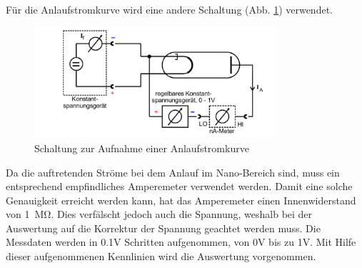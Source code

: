 Für die Anlaufstromkurve wird eine andere Schaltung (Abb. \ref{fig:8}) verwendet.
\begin{figure}[H]
  \centering
  \includegraphics[width=0.8\textwidth]{content/8.png}
  \caption{Schaltung zur Aufnahme einer Anlaufstromkurve \cite{sample}}
  \label{fig:8}
\end{figure}
Da die auftretenden Ströme bei dem Anlauf im Nano-Bereich sind, muss ein entsprechend empfindliches Amperemeter verwendet werden.
Damit eine solche Genauigkeit erreicht werden kann, hat das Amperemeter einen Innenwiderstand von \SI{1}{\mega\ohm}. Dies verfälscht jedoch auch die Spannung,
weshalb bei der Auswertung auf die Korrektur der Spannung geachtet werden muss.
Die Messdaten werden in 0.1V Schritten aufgenommen, von 0V bis zu 1V.
Mit Hilfe dieser aufgenommenen Kennlinien wird die Auswertung vorgenommen.
